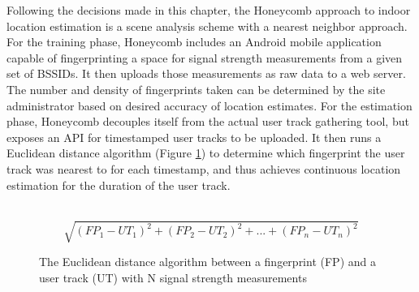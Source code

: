 Following the decisions made in this chapter, the Honeycomb approach to indoor location estimation is a scene analysis scheme with a nearest neighbor approach. For the training phase, Honeycomb includes an Android mobile application capable of fingerprinting a space for signal strength measurements from a given set of BSSIDs. It then uploads those measurements as raw data to a web server. The number and density of fingerprints taken can be determined by the site administrator based on desired accuracy of location estimates. For the estimation phase, Honeycomb decouples itself from the actual user track gathering tool, but exposes an API for timestamped user tracks to be uploaded. It then runs a Euclidean distance algorithm (Figure \ref{euclideandistance}) to determine which fingerprint the user track was nearest to for each timestamp, and thus achieves continuous location estimation for the duration of the user track. 

\begin{figure}[htb] 
	\begin{center}
		\ \[ \sqrt{(FP_{1} - UT_{1})^2 + (FP_{2} - UT_{2})^2 + ... + (FP_{n} - UT_{n})^2} \]
		\caption{The Euclidean distance algorithm between a fingerprint (FP) and a user track (UT) with N signal strength measurements}
		\label{euclideandistance}
	\end{center}
\end{figure}